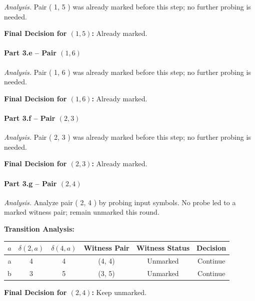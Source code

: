 \documentclass{article}
\begin{document}
\emph{Analysis.} Pair ( 1, 5 ) was already marked before this step; no further probing is needed.

\noindent\textbf{Final Decision for $( 1, 5 )$:} Already marked.

\vspace{0.75em}
\paragraph{Part 3.e \;–\; Pair $( 1, 6 )$}

\emph{Analysis.} Pair ( 1, 6 ) was already marked before this step; no further probing is needed.

\noindent\textbf{Final Decision for $( 1, 6 )$:} Already marked.

\vspace{0.75em}
\paragraph{Part 3.f \;–\; Pair $( 2, 3 )$}

\emph{Analysis.} Pair ( 2, 3 ) was already marked before this step; no further probing is needed.

\noindent\textbf{Final Decision for $( 2, 3 )$:} Already marked.

\vspace{0.75em}
\paragraph{Part 3.g \;–\; Pair $( 2, 4 )$}

\emph{Analysis.} Analyze pair ( 2, 4 ) by probing input symbols. No probe led to a marked witness pair; remain unmarked this round.

\noindent\textbf{Transition Analysis:}
\begin{center}
\begin{tabular}{c c c c c c}
\hline
$a$ & $\delta(2,a)$ & $\delta(4,a)$ & Witness Pair & Witness Status & Decision \\
\hline
a & 4 & 4 &
(4, 4) &
Unmarked &
Continue \\
b & 3 & 5 &
(3, 5) &
Unmarked &
Continue \\
\hline
\end{tabular}
\end{center}



\noindent\textbf{Final Decision for $( 2, 4 )$:} Keep unmarked.

\vspace{0.75em}
\end{document}
